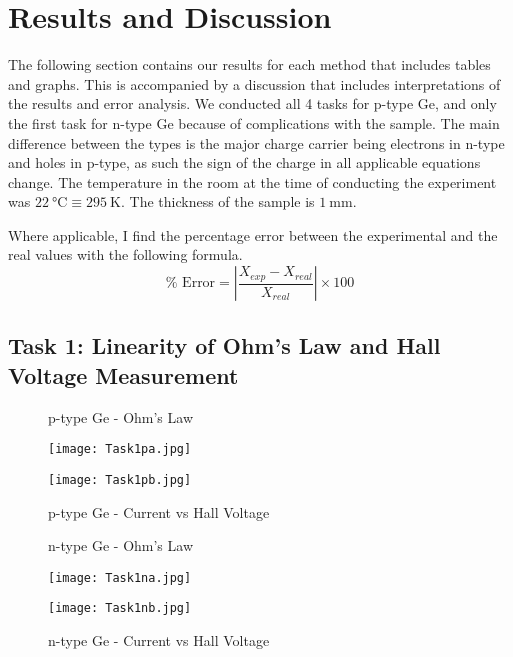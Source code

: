 \documentclass[11pt]{article}
\begin{document}
	\section{Results and Discussion}
	
	The following section contains our results for each method that includes tables and graphs. This is accompanied by a discussion that includes interpretations of the results and error analysis. We conducted all 4 tasks for p-type Ge, and only the first task for n-type Ge because of complications with the sample. The main difference between the types is the major charge carrier being electrons in n-type and holes in p-type, as such the sign of the charge in all applicable equations change. The temperature in the room at the time of conducting the experiment was $\qty{22}{\degreeCelsius} \equiv \qty{295}{\kelvin}$. The thickness of the sample is $\qty{1}{\milli\meter}$.
	
	Where applicable, I find the percentage error between the experimental and the real values with the following formula.
	\begin{equation}
		\% \text{ Error} = \left| \frac{X_{exp}-X_{real}}{X_{real}} \right| \times 100 \label{eq:12}
	\end{equation}
	
	\subsection{Task 1: Linearity of Ohm's Law and Hall Voltage Measurement}
	
	\begin{figure}[h!]
		\centering
		\begin{minipage}{0.45\textwidth}
			\centering
			\caption{p-type Ge - Ohm's Law}
			\texttt{[image: Task1pa.jpg]}
			\label{fig:image1}
		\end{minipage}\hfill
		\begin{minipage}{0.45\textwidth}
			\centering
			\caption{p-type Ge - Current vs Hall Voltage}
			\texttt{[image: Task1pb.jpg]}
			\label{fig:image2}
		\end{minipage}
	\end{figure}
	
	\begin{figure}[h!]
		\centering
		\begin{minipage}{0.45\textwidth}
			\centering
			\caption{n-type Ge - Ohm's Law}
			\texttt{[image: Task1na.jpg]}
			\label{fig:image3}
		\end{minipage}\hfill
		\begin{minipage}{0.45\textwidth}
			\centering
			\caption{n-type Ge - Current vs Hall Voltage}
			\texttt{[image: Task1nb.jpg]}
			\label{fig:image4}
		\end{minipage}
	\end{figure}
	
\end{document}
